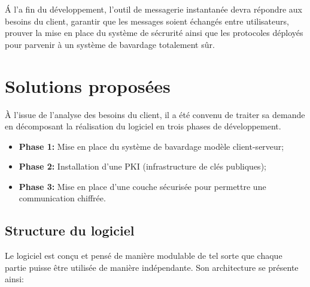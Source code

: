 \documentclass[a4paper,11pt,french]{book}
\begin{document}
\'A l'a fin du développement, l'outil de messagerie instantanée devra répondre aux besoins du client, garantir que les messages soient échangés entre utilisateurs, prouver la mise en place du système de sécrurité ainsi que les protocoles déployés pour parvenir à un système de bavardage totalement sûr.

\section{Solutions proposées}
\`A l'issue de l'analyse des besoins du client, il a été convenu de traiter sa demande en décomposant la réalisation du logiciel en trois phases de développement.
\begin{itemize}
\item \textbf{Phase 1:} Mise en place du système de bavardage modèle client-serveur;
\item \textbf{Phase 2:} Installation d'une PKI (infrastructure de clés publiques);
\item \textbf{Phase 3:} Mise en place d'une couche sécurisée pour permettre une communication chiffrée.
\end{itemize}
\vspace{.5cm}

\subsection{Structure du logiciel}
Le logiciel est conçu et pensé de manière modulable de tel sorte que chaque partie puisse \^etre utilisée de manière indépendante. Son architecture se présente ainsi:\\
\end{document}
